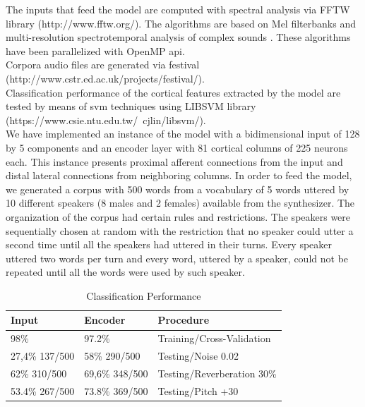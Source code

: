 \documentclass[11pt,a4paper]{article}
\begin{document}
The inputs that feed the model are computed
with spectral analysis via FFTW library (http://www.fftw.org/).
The algorithms are based on 
Mel filterbanks and multi-resolution
spectrotemporal analysis of complex sounds \cite{taishih_2005}.
These algorithms have been parallelized with OpenMP \gls{api}. \\

Corpora audio files are generated via \gls{festival} \\ (http://www.cstr.ed.ac.uk/projects/festival/). \\

Classification performance of the cortical features extracted by the model are tested by means of
\gls{svm} techniques using LIBSVM library (https://www.csie.ntu.edu.tw/~cjlin/libsvm/). \\

We have implemented an instance of the model with a bidimensional input
of 128 by 5 components and an encoder layer
with 81 cortical columns of 225 neurons each.
This instance presents proximal afferent connections
from the input and distal lateral connections from
neighboring columns.
In order to feed the model, we generated a corpus with 500 words from a vocabulary of
5 words uttered by 10 different speakers (8 males and 2 females) available from the synthesizer.
The organization of the corpus had certain rules and restrictions.
The speakers were sequentially chosen at random with the restriction that no speaker could
utter a second time until all the speakers had uttered in their turns.
Every speaker uttered two words per turn and every word, uttered by a speaker,
could not be repeated until all the words were used by such speaker. \\

\begin{table}[]
\centering
\caption{Classification Performance}
\label{classification_performances}
\begin{tabular}{|l|l|l|}
\hline
Input          & Encoder        & Procedure                  \\ \hline
98\%           & 97.2\%         & Training/Cross-Validation  \\ \hline
27,4\% 137/500 & 58\% 290/500   & Testing/Noise 0.02         \\ \hline
62\% 310/500   & 69,6\% 348/500 & Testing/Reverberation 30\% \\ \hline
53.4\% 267/500 & 73.8\% 369/500 & Testing/Pitch +30          \\ \hline
\end{tabular}
\end{table}
\end{document}
